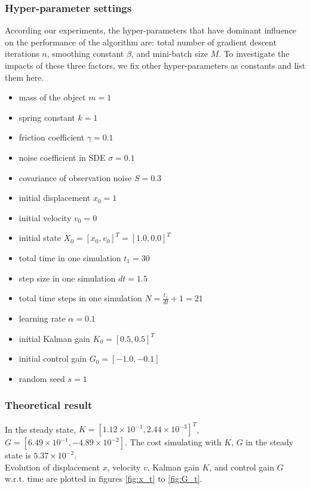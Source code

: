\documentclass{article}
\begin{document}
\subsubsection{Hyper-parameter settings}
According our experiments, the hyper-parameters that have dominant influence on the performance of the algorithm are: total number of gradient descent iterations $n$, smoothing constant $\beta$, and mini-batch size $M$. To investigate the impacts of these three factors, we fix other hyper-parameters as constants and list them here.
\begin{itemize}
	\item mass of the object $m = 1$
	\item spring constant $k = 1$
	\item friction coefficient $\gamma = 0.1$
	\item noise coefficient in SDE $\sigma = 0.1$
	\item covariance of observation noise $S = 0.3$
	\item initial displacement $x_0 = 1$
	\item initial velocity $v_0 = 0$
	\item initial state $X_0 = [x_0, v_0]^T = [1.0, 0.0]^T$
	\item total time in one simulation $t_1 = 30$
	\item step size in one simulation $dt = 1.5$
	\item total time steps in one simulation $N = \frac{t_1}{dt} + 1 = 21$
	\item learning rate $\alpha = 0.1$
	\item initial Kalman gain $K_0 = [0.5, 0.5]^T$
	\item initial control gain $G_0 = [-1.0, -0.1]$
	\item random seed $s = 1$
\end{itemize}

\subsubsection{Theoretical result}
In the steady state, $K = [1.12\times 10^{-1},  2.44\times 10^{-3}]^T$,
$G = [6.49\times 10^{-1}, -4.89\times 10^{-2}]$. The cost simulating with $K$, $G$ in the steady state is $5.37\times 10^{-2}$.\\
Evolution of displacement $x$, velocity $v$, Kalman gain $K$, and control gain $G$ w.r.t. time are plotted in figures \ref{fig:x_t} to \ref{fig:G_t}.\\
\end{document}
